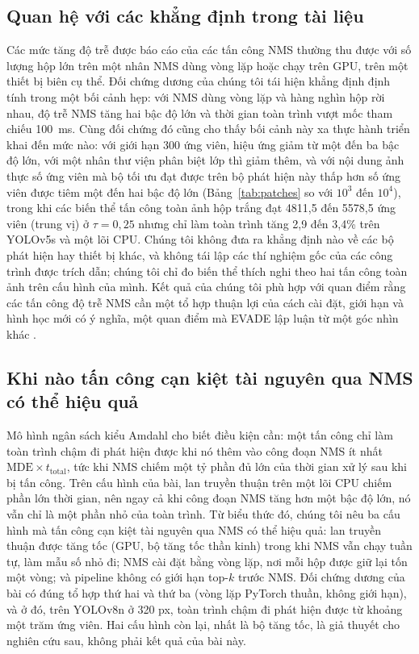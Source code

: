 \documentclass[12pt,a4paper]{article}
\begin{document}
\subsection{Quan hệ với các khẳng định trong tài liệu}
Các mức tăng độ trễ được báo cáo của các tấn công NMS thường thu được với số lượng hộp lớn trên một nhân NMS dùng vòng lặp hoặc chạy trên GPU, trên một thiết bị biên cụ thể. Đối chứng dương của chúng tôi tái hiện khẳng định định tính trong một bối cảnh hẹp: với NMS dùng vòng lặp và hàng nghìn hộp rời nhau, độ trễ NMS tăng hai bậc độ lớn và thời gian toàn trình vượt mốc tham chiếu 100~ms. Cùng đối chứng đó cũng cho thấy bối cảnh này xa thực hành triển khai đến mức nào: với giới hạn 300 ứng viên, hiệu ứng giảm từ một đến ba bậc độ lớn, với một nhân thư viện phân biệt lớp thì giảm thêm, và với nội dung ảnh thực số ứng viên mà bộ tối ưu đạt được trên bộ phát hiện này thấp hơn số ứng viên được tiêm một đến hai bậc độ lớn (Bảng~\ref{tab:patches} so với $10^3$ đến $10^4$), trong khi các biến thể tấn công toàn ảnh hộp trắng đạt 4811,5 đến 5578,5 ứng viên (trung vị) ở $\tau=0{,}25$ nhưng chỉ làm toàn trình tăng 2,9 đến 3,4\% trên YOLOv5s và một lõi CPU. Chúng tôi không đưa ra khẳng định nào về các bộ phát hiện hay thiết bị khác, và không tái lập các thí nghiệm gốc của các công trình được trích dẫn; chúng tôi chỉ đo biến thể thích nghi theo hai tấn công toàn ảnh trên cấu hình của mình. Kết quả của chúng tôi phù hợp với quan điểm rằng các tấn công độ trễ NMS cần một tổ hợp thuận lợi của cách cài đặt, giới hạn và hình học mới có ý nghĩa, một quan điểm mà EVADE lập luận từ một góc nhìn khác \cite{evade2025}.

\subsection{Khi nào tấn công cạn kiệt tài nguyên qua NMS có thể hiệu quả}
Mô hình ngân sách kiểu Amdahl cho biết điều kiện cần: một tấn công chỉ làm toàn trình chậm đi phát hiện được khi nó thêm vào công đoạn NMS ít nhất $\mathrm{MDE}\times t_{\mathrm{total}}$, tức khi NMS chiếm một tỷ phần đủ lớn của thời gian xử lý sau khi bị tấn công. Trên cấu hình của bài, lan truyền thuận trên một lõi CPU chiếm phần lớn thời gian, nên ngay cả khi công đoạn NMS tăng hơn một bậc độ lớn, nó vẫn chỉ là một phần nhỏ của toàn trình. Từ biểu thức đó, chúng tôi nêu ba cấu hình mà tấn công cạn kiệt tài nguyên qua NMS có thể hiệu quả: lan truyền thuận được tăng tốc (GPU, bộ tăng tốc thần kinh) trong khi NMS vẫn chạy tuần tự, làm mẫu số nhỏ đi; NMS cài đặt bằng vòng lặp, nơi mỗi hộp được giữ lại tốn một vòng; và pipeline không có giới hạn top-$k$ trước NMS. Đối chứng dương của bài có đúng tổ hợp thứ hai và thứ ba (vòng lặp PyTorch thuần, không giới hạn), và ở đó, trên YOLOv8n ở 320 px, toàn trình chậm đi phát hiện được từ khoảng một trăm ứng viên. Hai cấu hình còn lại, nhất là bộ tăng tốc, là giả thuyết cho nghiên cứu sau, không phải kết quả của bài này.
\end{document}
